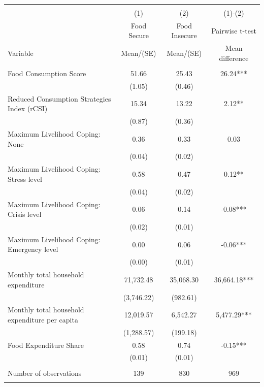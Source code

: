 
\begin{tabular}{@{\extracolsep{5pt}}lccc}
\\[-1.8ex]\hline \hline \\[-1.8ex]
 & \multicolumn{1}{c}{(1)}  & \multicolumn{1}{c}{(2)}  & \multicolumn{1}{c}{(1)-(2)} \\
 & \multicolumn{1}{c}{Food Secure}  & \multicolumn{1}{c}{Food Insecure}  & \multicolumn{1}{c}{Pairwise t-test}  \\
Variable & Mean/(SE) & Mean/(SE) & Mean difference \\ \hline \\[-1.8ex] 
Food Consumption Score   & 51.66    & 25.43    & 26.24***   \\
 & (1.05)  & (0.46)  &  \\ [1ex]
Reduced Consumption Strategies Index (rCSI)   & 15.34    & 13.22    & 2.12**   \\
 & (0.87)  & (0.36)  &  \\ [1ex]
Maximum Livelihood Coping: None   & 0.36    & 0.33    & 0.03   \\
 & (0.04)  & (0.02)  &  \\ [1ex]
Maximum Livelihood Coping: Stress level   & 0.58    & 0.47    & 0.12**   \\
 & (0.04)  & (0.02)  &  \\ [1ex]
Maximum Livelihood Coping: Crisis level   & 0.06    & 0.14    & -0.08***   \\
 & (0.02)  & (0.01)  &  \\ [1ex]
Maximum Livelihood Coping: Emergency level   & 0.00    & 0.06    & -0.06***   \\
 & (0.00)  & (0.01)  &  \\ [1ex]
Monthly total household expenditure   & 71,732.48    & 35,068.30    & 36,664.18***   \\
 & (3,746.22)  & (982.61)  &  \\ [1ex]
Monthly total household expenditure per capita   & 12,019.57    & 6,542.27    & 5,477.29***   \\
 & (1,288.57)  & (199.18)  &  \\ [1ex]
Food Expenditure Share   & 0.58    & 0.74    & -0.15***   \\
 & (0.01)  & (0.01)  &  \\ [1ex]
\hline \\[-1.8ex]
Number of observations  & 139   & 830  & 969  \\
\hline \hline \\[-1.8ex]

\end{tabular}
